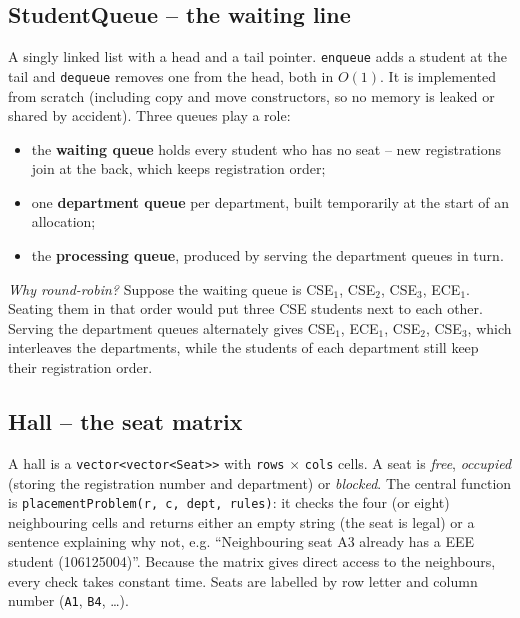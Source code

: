\documentclass[12pt,a4paper]{report}
\begin{document}
\subsection{StudentQueue -- the waiting line}
A singly linked list with a head and a tail pointer. \texttt{enqueue} adds a student at the tail and \texttt{dequeue} removes one from the head, both in $O(1)$. It is implemented from scratch (including copy and move constructors, so no memory is leaked or shared by accident). Three queues play a role:
\begin{itemize}
  \item the \textbf{waiting queue} holds every student who has no seat -- new registrations join at the back, which keeps registration order;
  \item one \textbf{department queue} per department, built temporarily at the start of an allocation;
  \item the \textbf{processing queue}, produced by serving the department queues in turn.
\end{itemize}
\emph{Why round-robin?} Suppose the waiting queue is CSE$_1$, CSE$_2$, CSE$_3$, ECE$_1$. Seating them in that order would put three CSE students next to each other. Serving the department queues alternately gives CSE$_1$, ECE$_1$, CSE$_2$, CSE$_3$, which interleaves the departments, while the students of each department still keep their registration order.

\subsection{Hall -- the seat matrix}
A hall is a \texttt{vector<vector<Seat>>} with \texttt{rows} $\times$ \texttt{cols} cells. A seat is \emph{free}, \emph{occupied} (storing the registration number and department) or \emph{blocked}. The central function is \texttt{placementProblem(r, c, dept, rules)}: it checks the four (or eight) neighbouring cells and returns either an empty string (the seat is legal) or a sentence explaining why not, e.g. ``Neighbouring seat A3 already has a EEE student (106125004)''. Because the matrix gives direct access to the neighbours, every check takes constant time. Seats are labelled by row letter and column number (\texttt{A1}, \texttt{B4}, \dots).
\end{document}
